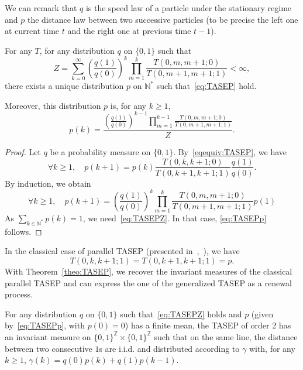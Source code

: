 \documentclass[AHL,Unicode,longabstracts]{cedram}
\newcounter{a}
\newcommand{\NN}{\mathbb{N}}
\newcommand{\ZZ}{\mathbb{Z}}
\let\oldforall\forall
\renewcommand*{\forall}{\mathrel{\oldforall}}
\begin{document}
We can remark that $q$ is the speed law of a particle under the stationary regime and $p$ the distance law between two successive particles (to be precise the left one at current time $t$ and the right one at previous time $t-1$).



\begin{theo}\label{theo:TASEP}
For any $T$, for any distribution $q$ on $\{0,1\}$ such that
\begin{equation}\label{eq:TASEPZ}
Z = \sum_{k=0}^\infty \left(\frac{q(1)}{q(0)}\right)^k \prod_{m=1}^k \frac{T(0,m,m+1;0)}{T(0,m+1,m+1;1)} < \infty,
\end{equation}
there exists a unique distribution $p$ on $\NN^*$ such that~\eqref{eq:TASEP} hold.

Moreover, this distribution $p$ is, for any $k \geq 1$,
\begin{equation}\label{eq:TASEPp}
p(k) = \frac{\displaystyle \left(\frac{q(1)}{q(0)}\right)^{k-1} \prod_{m=1}^{k-1} \frac{T(0,m,m+1;0)}{T(0,m+1,m+1;1)}}{Z}.
\end{equation}
\end{theo}

\begin{proof}
Let $q$ be a probability measure on $\{0,1\}$. By~\eqref{eqequiv:TASEP}, we have
\begin{equation}\label{eq:TASEPind}
\forall k\geq 1, \quad p(k+1) = p(k) \frac{T(0,k,k+1;0)}{T(0,k+1,k+1;1)} \frac{q(1)}{q(0)}.
\end{equation}
By induction, we obtain
\begin{equation*}
\forall k\geq 1, \quad p(k+1)=\left(\frac{q(1)}{q(0)}\right)^k \prod_{m=1}^k \frac{T(0,m,m+1;0)}{T(0,m+1,m+1;1)} p(1)
\end{equation*}
As $\sum_{k\in\NN^*} p(k) = 1$, we need~\eqref{eq:TASEPZ}. In that case, \eqref{eq:TASEPp} follows.
\end{proof}

In the classical case of parallel TASEP (presented in~\cite[Sections~2.3 \& 4.3]{mm_tcs},~\cite[Section~3.3]{Casse16}), we have
\begin{equation}\label{eq:classTASEP}
T(0,k,k+1;1) = T(0,k+1,k+1;1) = p.
\end{equation}
With Theorem~\ref{theo:TASEP}, we recover the invariant measures of the classical parallel TASEP and can express the one of the generalized TASEP as a renewal process.


\begin{coro}
For any distribution $q$ on $\{0,1\}$ such that~\eqref{eq:TASEPZ} holds and $p$ (given by~\eqref{eq:TASEPp}, with $p(0)=0$) has a finite mean, the TASEP of order 2 has an invariant measure on $\{0,1\}^\ZZ \times \{0,1\}^\ZZ$ such that on the same line, the distance between two consecutive $1$s are i.i.d. and distributed according to $\gamma$ with, for any $k \geq 1$, $\gamma(k) = q(0) p(k) + q(1)p(k-1)$.
\end{coro}
\end{document}
